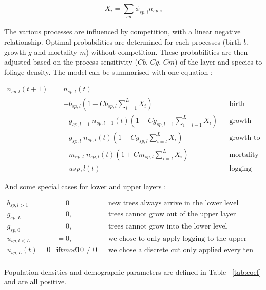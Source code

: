 \documentclass{article}
\begin{document}
\begin{equation}
    X_{i} = \sum_{sp} \phi_{sp,i} n_{sp,i}
\end{equation}

The various processes are influenced by competition, with a linear negative relationship. Optimal probabilities are determined for each processes (birth $b$, growth $g$ and mortality $m$) without competition. These probabilities are then adjusted based on the process sensitivity ($Cb$, $Cg$, $Cm$) of the layer and species to foliage density.
The model can be summarised with one equation :

\begin{equation}
\begin{aligned}
    n_{sp,l}(t+1) = {} & n_{sp,l}(t) \\
    & + b_{sp,l} (1 - Cb_{sp,l} \sum_{i = 1}^{L} X_{i}) &&\text{birth} \\
    & + g_{sp,l - 1} \; n_{sp,l-1}(t) (1 - Cg_{sp,l-1} \sum_{i = l-1}^{L} X_{i}) &&\text{growth from lower level}\\
    & - g_{sp,l} \; n_{sp,l}(t) (1 - Cg_{sp,l} \sum_{i = l}^{L} X_{i}) &&\text{growth to upper level}\\
    & - m_{sp,l} \; n_{sp,l}(t) (1 + Cm_{sp,l} \sum_{i = l}^{L} X_{i}) &&\text{mortality} \\
    & - u{sp, l}(t) &&\text{logging}
\end{aligned}
\label{eq:model_general}
\end{equation}

And some special cases for lower and upper layers :

\begin{equation}
\begin{aligned}
    b_{sp,l>1} & = 0 && \text{new trees always arrive in the lower level} \\
    g_{sp,L} & = 0, && \text{trees cannot grow out of the upper layer} \\
    g_{sp,0} & = 0, && \text{trees cannot grow into the lower level} \\
    u_{sp,l<L} & = 0, && \text{we chose to only apply logging to the upper level} \\
    u_{sp,L}(t) = 0 & \text{if} t mod 10 \neq 0 && \text{we chose a discrete cut only applied every ten years} \\ 
\end{aligned}
\label{eq:model_conditions}
\end{equation}

Population densities and demographic parameters are defined in Table ~\ref{tab:coef} and are all positive.
\end{document}
